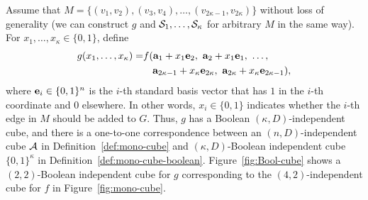 {%
Assume that 
$M = \{(v_1, v_2), (v_3, v_4), \ldots, (v_{2\kappa-1}, v_{2\kappa})\}$ without loss of generality 
(we can construct $g$ and $\mathcal{S}_1, \ldots, \mathcal{S}_\kappa$ for arbitrary $M$ in the same way). 
For $x_1, \ldots, x_\kappa \in \{0,1\}$, 
define
\begin{align*}
  g(x_1, \ldots, x_\kappa) = & f(\mathbf{a}_1 + x_1 \mathbf{e}_2,~ \mathbf{a}_2 + x_1 \mathbf{e}_1,~ \ldots,  \\
  &\hspace{3.3mm}\mathbf{a}_{2\kappa-1} + x_\kappa \mathbf{e}_{2\kappa},~ \mathbf{a}_{2\kappa} + x_\kappa \mathbf{e}_{2\kappa-1}),
\end{align*}
where $\mathbf{e}_i \in \{0,1\}^n$ is the $i$-th standard basis vector that has $1$ in the $i$-th coordinate and $0$ elsewhere. 
In other words, 
$x_i \in \{0,1\}$ indicates whether the $i$-th edge in $M$ should be
added to 
$G$. 
Thus, $g$ has a Boolean $(\kappa,D)$-independent cube, and 
there is a one-to-one correspondence between an $(n,D)$-independent cube $\mathcal{A}$ in Definition~\ref{def:mono-cube} 
and 
$(\kappa,D)$-Boolean independent cube $\{0,1\}^\kappa$ in Definition~\ref{def:mono-cube-boolean}. 
Figure~\ref{fig:Bool-cube} shows a $(2,2)$-Boolean independent cube for $g$ corresponding to the $(4,2)$-independent cube for $f$ in Figure~\ref{fig:mono-cube}.

}
